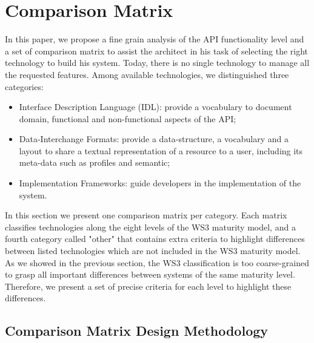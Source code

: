 \section{Comparison Matrix}\label{sec:matrix}



In this paper, we propose a fine grain analysis of the API functionality level and a set of comparison matrix to assist the architect in his task of selecting the right technology to build his system. 
Today, there is no single technology to manage all the requested features. Among available technologies, we distinguished three categories:

\begin{itemize}
    \item Interface Description Language (IDL): provide a vocabulary to document domain, functional and non-functional aspects of the API;
    \item Data-Interchange Formats: provide a data-structure, a vocabulary and a layout to share a textual representation of a resource to a user, including its meta-data such as profiles and semantic;
    \item Implementation Frameworks: guide developers in the implementation of the system.
\end{itemize}

In this section we present one comparison matrix per category. Each matrix classifies technologies along the eight levels of the WS3 maturity model, and a fourth category called "other" that contains extra criteria to highlight differences between listed technologies which are not included in the WS3 maturity model. As we showed in the previous section, the WS3 classification is too coarse-grained to grasp all important differences between systems of the same maturity level. Therefore, we present a set of precise criteria for each level to highlight these differences.

\subsection{Comparison Matrix Design Methodology}


